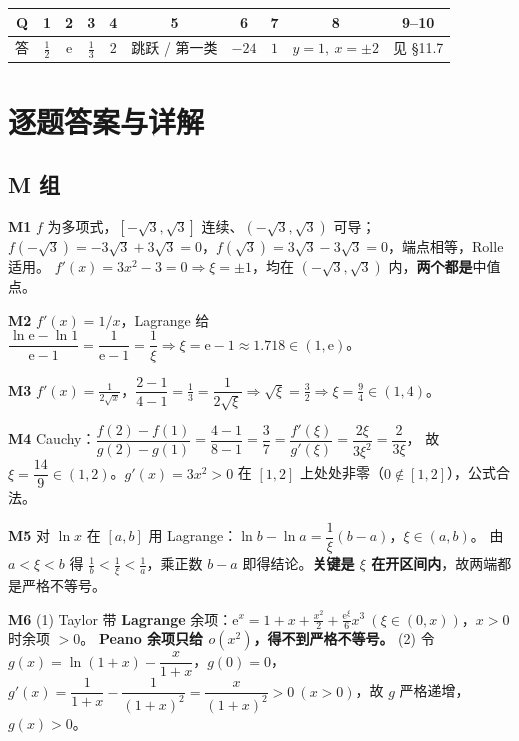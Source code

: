 \documentclass[11pt,a4paper]{ctexart}
\newcommand{\ee}{\mathrm{e}}
\begin{document}
\begin{center}
\small\setlength{\tabcolsep}{4pt}
\begin{tabularx}{\linewidth}{c|c|c|c|c|c|c|c|c|c}
\toprule
Q & 1 & 2 & 3 & 4 & 5 & 6 & 7 & 8 & 9--10 \\
\midrule
答 & $\frac12$ & $\ee$ & $\frac13$ & $2$ & 跳跃 / 第一类 & $-24$ & $1$ & $y=1,\ x=\pm2$ & 见 \S 11.7 \\
\bottomrule
\end{tabularx}
\end{center}

\newpage
\section{逐题答案与详解}

\subsection{M 组}

\textbf{M1} $f$ 为多项式，$[-\sqrt3,\sqrt3]$ 连续、$(-\sqrt3,\sqrt3)$ 可导；$f(-\sqrt3)=-3\sqrt3+3\sqrt3=0$，$f(\sqrt3)=3\sqrt3-3\sqrt3=0$，端点相等，Rolle 适用。
$f'(x)=3x^2-3=0\Rightarrow \xi=\pm1$，均在 $(-\sqrt3,\sqrt3)$ 内，\textbf{两个都是}中值点。

\textbf{M2} $f'(x)=1/x$，Lagrange 给 $\dfrac{\ln\ee-\ln1}{\ee-1}=\dfrac1{\ee-1}=\dfrac1\xi\Rightarrow \xi=\ee-1\approx1.718\in(1,\ee)$。

\textbf{M3} $f'(x)=\frac1{2\sqrt x}$，$\dfrac{2-1}{4-1}=\frac13=\dfrac1{2\sqrt\xi}\Rightarrow\sqrt\xi=\frac32\Rightarrow \xi=\frac94\in(1,4)$。

\textbf{M4} Cauchy：$\dfrac{f(2)-f(1)}{g(2)-g(1)}=\dfrac{4-1}{8-1}=\dfrac37=\dfrac{f'(\xi)}{g'(\xi)}=\dfrac{2\xi}{3\xi^2}=\dfrac2{3\xi}$，
故 $\xi=\dfrac{14}{9}\in(1,2)$。$g'(x)=3x^2>0$ 在 $[1,2]$ 上处处非零（$0\notin[1,2]$），公式合法。

\textbf{M5} 对 $\ln x$ 在 $[a,b]$ 用 Lagrange：$\ln b-\ln a=\dfrac1\xi(b-a)$，$\xi\in(a,b)$。
由 $a<\xi<b$ 得 $\frac1b<\frac1\xi<\frac1a$，乘正数 $b-a$ 即得结论。\textbf{关键是 $\xi$ 在开区间内}，故两端都是严格不等号。

\textbf{M6} (1) Taylor 带 \textbf{Lagrange} 余项：$\ee^x=1+x+\frac{x^2}2+\frac{\ee^\xi}{6}x^3\ (\xi\in(0,x))$，$x>0$ 时余项 $>0$。
\textbf{Peano 余项只给 $o(x^2)$，得不到严格不等号。}
(2) 令 $g(x)=\ln(1+x)-\dfrac{x}{1+x}$，$g(0)=0$，$g'(x)=\dfrac1{1+x}-\dfrac1{(1+x)^2}=\dfrac{x}{(1+x)^2}>0\ (x>0)$，故 $g$ 严格递增，$g(x)>0$。
\end{document}
